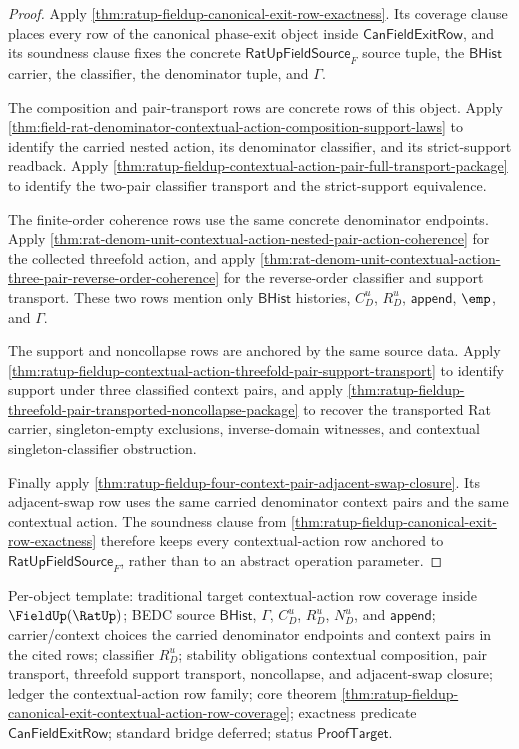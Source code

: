 \begin{proof}
Apply \autoref{thm:ratup-fieldup-canonical-exit-row-exactness}. Its coverage
clause places every row of the canonical phase-exit object inside
$\mathsf{CanFieldExitRow}$, and its soundness clause fixes the concrete
$\mathsf{RatUpFieldSource}_F$ source tuple, the $\mathsf{BHist}$ carrier, the
classifier, the denominator tuple, and $\Gamma$.

The composition and pair-transport rows are concrete rows of this object. Apply
\autoref{thm:field-rat-denominator-contextual-action-composition-support-laws}
to identify the carried nested action, its denominator classifier, and its
strict-support readback. Apply
\autoref{thm:ratup-fieldup-contextual-action-pair-full-transport-package} to
identify the two-pair classifier transport and the strict-support equivalence.

The finite-order coherence rows use the same concrete denominator endpoints.
Apply \autoref{thm:rat-denom-unit-contextual-action-nested-pair-action-coherence}
for the collected threefold action, and apply
\autoref{thm:rat-denom-unit-contextual-action-three-pair-reverse-order-coherence}
for the reverse-order classifier and support transport. These two rows mention
only $\mathsf{BHist}$ histories, $C_D^u$, $R_D^u$, $\mathsf{append}$, $\emp$,
and $\Gamma$.

The support and noncollapse rows are anchored by the same source data. Apply
\autoref{thm:ratup-fieldup-contextual-action-threefold-pair-support-transport}
to identify support under three classified context pairs, and apply
\autoref{thm:ratup-fieldup-threefold-pair-transported-noncollapse-package} to
recover the transported Rat carrier, singleton-empty exclusions, inverse-domain
witnesses, and contextual singleton-classifier obstruction.

Finally apply
\autoref{thm:ratup-fieldup-four-context-pair-adjacent-swap-closure}. Its
adjacent-swap row uses the same carried denominator context pairs and the same
contextual action. The soundness clause from
\autoref{thm:ratup-fieldup-canonical-exit-row-exactness} therefore keeps every
contextual-action row anchored to $\mathsf{RatUpFieldSource}_F$, rather than to
an abstract operation parameter.
\end{proof}

Per-object template: traditional target contextual-action row coverage inside
$\FieldUp(\RatUp)$; BEDC source $\mathsf{BHist}$, $\Gamma$, $C_D^u$, $R_D^u$,
$N_D^u$, and $\mathsf{append}$; carrier/context choices the carried denominator
endpoints and context pairs in the cited rows; classifier $R_D^u$; stability
obligations contextual composition, pair transport, threefold support transport,
noncollapse, and adjacent-swap closure; ledger the contextual-action row family;
core theorem
\autoref{thm:ratup-fieldup-canonical-exit-contextual-action-row-coverage};
exactness predicate $\mathsf{CanFieldExitRow}$; standard bridge deferred; status
$\mathsf{ProofTarget}$.

